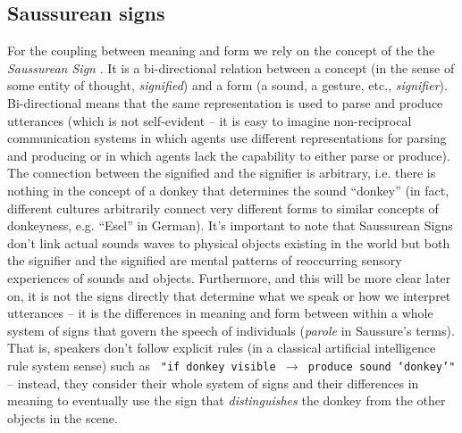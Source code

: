 \subsection{Saussurean signs}
\label{s:saussurean-signs}

For the coupling between meaning and form we rely on the concept of
the the \emph{Saussurean Sign} \citep{saussure67cours}. It is a
bi-directional relation between a concept (in the sense of some entity
of thought, \emph{signified}) and a form (a sound, a gesture, etc.,
\emph{signifier}). Bi-directional means that the same representation
is used to parse and produce utterances (which is not self-evident --
it is easy to imagine non-reciprocal communication systems in which
agents use different representations for parsing and producing or in
which agents lack the capability to either parse or produce). The
connection between the signified and the signifier is arbitrary, i.e.
there is nothing in the concept of a donkey that determines the sound
``donkey'' (in fact, different cultures arbitrarily connect very
different forms to similar concepts of donkeyness, e.g. ``Esel'' in
German). It's important to note that Saussurean Signs don't link
actual sounds waves to physical objects existing in the world but both
the signifier and the signified are mental patterns of reoccurring
sensory experiences of sounds and objects. Furthermore, and this will
be more clear later on, it is not the signs directly that determine
what we speak or how we interpret utterances -- it is the differences
in meaning and form between within a whole system of signs that govern
the speech of individuals (\emph{parole} in Saussure's terms). That
is, speakers don't follow explicit rules (in a classical artificial
intelligence rule system sense) such as {\tt \ "if donkey visible
  $\rightarrow$ produce sound `donkey'"} -- instead, they consider
their whole system of signs and their differences in meaning to
eventually use the sign that \emph{distinguishes} the donkey from
the other objects in the scene.

